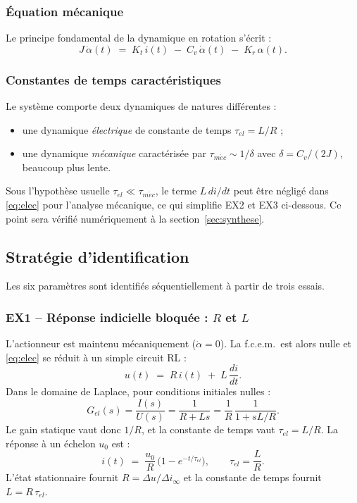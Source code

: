 \subsubsection{Équation mécanique}

Le principe fondamental de la dynamique en rotation s'écrit :
\begin{equation}
J\,\ddot{\alpha}(t) \;=\; K_t\,i(t) \;-\; C_v\,\dot{\alpha}(t) \;-\; K_r\,\alpha(t).
\label{eq:meca}
\end{equation}

\subsubsection{Constantes de temps caractéristiques}

Le système comporte deux dynamiques de natures différentes :
\begin{itemize}
    \item une dynamique \emph{électrique} de constante de temps \(\tau_{el} = L/R\) ;
    \item une dynamique \emph{mécanique} caractérisée par \(\tau_{m\acute{e}c} \sim 1/\delta\) avec \(\delta = C_v/(2J)\), beaucoup plus lente.
\end{itemize}
Sous l'hypothèse usuelle \(\tau_{el} \ll \tau_{m\acute{e}c}\), le terme \(L\,di/dt\) peut être négligé dans \eqref{eq:elec} pour l'analyse mécanique, ce qui simplifie EX2 et EX3 ci-dessous. Ce point sera vérifié numériquement à la section~\ref{sec:synthese}.

\subsection{Stratégie d'identification}
\label{sec:strat_ident}

Les six paramètres sont identifiés séquentiellement à partir de trois essais.

\subsubsection{EX1 -- Réponse indicielle bloquée : \texorpdfstring{\(R\)}{R} et \texorpdfstring{\(L\)}{L}}

L'actionneur est maintenu mécaniquement (\(\dot{\alpha} = 0\)). La f.c.e.m.\ est alors nulle et \eqref{eq:elec} se réduit à un simple circuit RL :
\[
u(t) \;=\; R\,i(t) \;+\; L\,\frac{di}{dt}.
\]
Dans le domaine de Laplace, pour conditions initiales nulles :
\[
G_{el}(s) = \frac{I(s)}{U(s)} = \frac{1}{R + Ls}
= \frac{1}{R}\,\frac{1}{1 + sL/R}.
\]
Le gain statique vaut donc \(1/R\), et la constante de temps vaut \(\tau_{el}=L/R\).
La réponse à un échelon \(u_0\) est :
\begin{equation}
i(t) \;=\; \frac{u_0}{R}\,\bigl(1 - e^{-t/\tau_{el}}\bigr), \qquad \tau_{el} = \frac{L}{R}.
\label{eq:i_RL}
\end{equation}
L'état stationnaire fournit \(R = \Delta u/\Delta i_{\infty}\) et la constante de temps fournit \(L = R\,\tau_{el}\).


